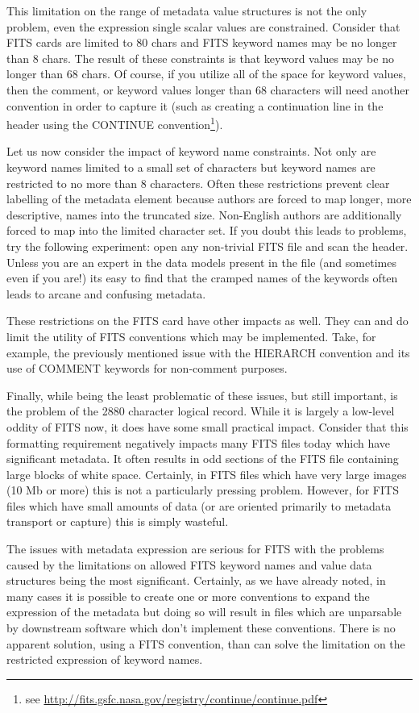 \documentclass[final,authoryear,5p,times,twocolumn]{elsarticle}
\begin{document}
This limitation on the range of metadata value structures is not the
only problem, even the expression single scalar values are
constrained. Consider that FITS cards are limited to 80 chars and FITS
keyword names may be no longer than 8 chars. The result of these
constraints is that keyword values may be no longer than 68 chars. Of
course, if you utilize all of the space for keyword values, then the
comment, or keyword values longer than 68 characters will need another
convention in order to capture it (such as creating a continuation
line in the header using the CONTINUE convention\footnote{see \url{http://fits.gsfc.nasa.gov/registry/continue/continue.pdf}}).


Let us now consider the impact of keyword name constraints. Not only
are keyword names limited to a small set of characters but keyword
names are restricted to no more than 8 characters. Often these
restrictions prevent clear labelling of the metadata element because
authors are forced to map longer, more descriptive, names into the
truncated size. Non-English authors are additionally forced to map
into the limited character set. If you doubt this leads to problems,
try the following experiment: open any non-trivial FITS file and scan
the header. Unless you are an expert in the data models present in the
file (and sometimes even if you are!) its easy to find that the
cramped names of the keywords often leads to arcane and confusing
metadata.


These restrictions on the FITS card have other impacts as well. They
can and do limit the utility of FITS conventions which may be
implemented. Take, for example, the previously mentioned issue with
the HIERARCH convention and its use of COMMENT keywords for
non-comment purposes.


Finally, while being the least problematic of these issues, but still
important, is the problem of the 2880 character logical record. While
it is largely a low-level oddity of FITS now, it does have some small
practical impact. Consider that this formatting requirement negatively
impacts many FITS files today which have significant metadata. It
often results in odd sections of the FITS file containing large blocks
of white space. Certainly, in FITS files which have very large images
(10 Mb or more) this is not a particularly pressing
problem. However, for FITS files which have small amounts of data (or
are oriented primarily to metadata transport or capture) this is
simply wasteful.


The issues with metadata expression are serious for FITS with the
problems caused by the limitations on allowed FITS keyword names and
value data structures being the most significant. Certainly, as we
have already noted, in many cases it is possible to create one or more
conventions to expand the expression of the metadata but doing so will
result in files which are unparsable by downstream software which
don't implement these conventions. There is no apparent solution,
using a FITS convention, than can solve the limitation on the
restricted expression of keyword names.
\end{document}
